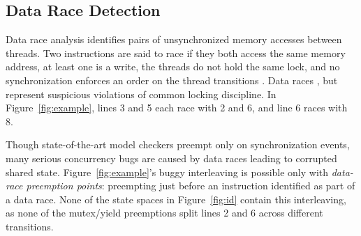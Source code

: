 \subsection{Data Race Detection}
\label{sec:overview-dr}

Data race analysis \cite{eraser} identifies pairs of unsynchronized memory accesses between threads.
Two instructions are said to race if
they both access the same memory address,
at least one is a write,
the threads do not hold the same lock,
and no synchronization enforces an order on the thread transitions .
Data races , but represent suspicious violations of common locking discipline.
In Figure~\ref{fig:example}, lines 3 and 5 each race with 2 and 6, and line 6 races with 8.

Though state-of-the-art model checkers preempt only on synchronization events,
many serious concurrency bugs are caused by data races leading to corrupted shared state.
Figure~\ref{fig:example}'s buggy interleaving is possible only with {\em data-race preemption points}:
preempting just before an instruction identified as part of a data race.
None of the state spaces in Figure~\ref{fig:id} contain this interleaving,
as none of the mutex/yield preemptions split lines 2 and 6 across different transitions.

